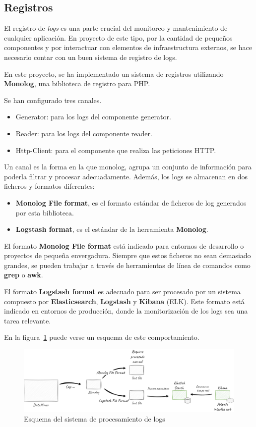 \subsection*{Registros}

El registro de \textit{logs} es una parte crucial del monitoreo y mantenimiento de cualquier aplicación.
En proyecto de este tipo, por la cantidad de pequeños componentes y por interactuar con elementos de infraestructura
externos, se hace necesario contar con un buen sistema de registro de logs.

En este proyecto, se ha implementado un sistema de registros utilizando \textbf{Monolog}, una biblioteca de registro
para PHP.

Se han configurado tres canales.

\begin{itemize}
    \item Generator: para los logs del componente generator.
    \item Reader: para los logs del componente reader.
    \item Http-Client: para el componente que realiza las peticiones HTTP.
\end{itemize}

Un canal es la forma en la que monolog, agrupa un conjunto de información para poderla filtrar y procesar adecuadamente.
Además, los logs se almacenan en dos ficheros y formatos diferentes:

\begin{itemize}
    \item \textbf{Monolog File format}, es el formato estándar de ficheros de log generados por esta biblioteca.
    \item \textbf{Logstash format}, es el estándar de la herramienta \textbf{Monolog}.
\end{itemize}

El formato \textbf{Monolog File format} está indicado para entornos de desarrollo o proyectos de pequeña envergadura.
Siempre que estos ficheros no sean demasiado grandes, se pueden trabajar a través de herramientas de línea de comandos
como \textbf{grep} o \textbf{awk}.

El formato \textbf{Logstash format} es adecuado para ser procesado por un sistema compuesto por
\textbf{Elasticsearch}, \textbf{Logstash} y \textbf{Kibana} (ELK).
Este formato está indicado en entornos de producción, donde la monitorización de los logs sea una tarea relevante.

En la figura~\ref{fig:chapter_4.4.logs_overview} puede verse un esquema de este comportamiento.

\begin{figure}[ht]
    \begin{center}
        \includegraphics[width=\textwidth]{./chapter/4/images/chapter_4.4.logs_overview}
        \caption{Esquema del sistema de procesamiento de logs}
        \label{fig:chapter_4.4.logs_overview}
    \end{center}
\end{figure}
